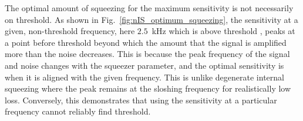 
The optimal amount of squeezing for the maximum sensitivity is not necessarily on threshold. As shown in Fig.~\ref{fig:nIS_optimum_squeezing}, the sensitivity at a given, non-threshold frequency, here $2.5$~kHz which is above threshold , peaks at a point before threshold beyond which the amount that the signal is amplified more than the noise decreases.
This is because the peak frequency of the signal and noise changes with the squeezer parameter, and the optimal sensitivity is when it is aligned with the given frequency. This is unlike degenerate internal squeezing where the peak remains at the sloshing frequency for realistically low loss. %
Conversely, this demonstrates that using the sensitivity at a particular frequency cannot reliably find threshold. %



